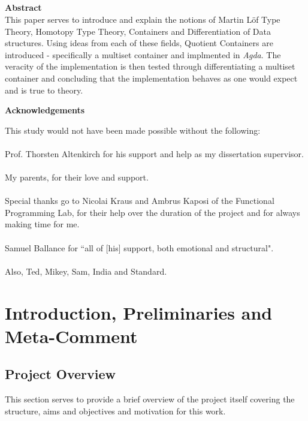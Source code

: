 \documentclass[12pt]{report}
\begin{document}
\setcounter{chapter}{-1}
\chapter{}
\Huge
\noindent \textbf{Abstract}\\

\normalsize
This paper serves to introduce and explain the notions of Martin L\"of Type Theory, Homotopy Type Theory, Containers and Differentiation of Data structures. Using ideas from each of these fields, Quotient Containers are introduced - specifically a multiset container and implmented in \textit{Agda}. The veracity of the implementation is then tested through differentiating a multiset container and concluding that the implementation behaves as one would expect and is true to theory.

\Huge

\noindent \textbf{Acknowledgements}

\normalsize

This study would not have been made possible without the following:\\
\\
Prof. Thorsten Altenkirch for his support and help as my dissertation supervisor.\\
\\
My parents, for their love and support.\\
\\
Special thanks go to Nicolai Kraus and Ambrus Kaposi of the Functional Programming Lab, for their help over the duration of the project and for always making time for me.\\
\\
Samuel Ballance for ``all of [his] support, both emotional and structural".
\\
\\
Also, Ted, Mikey, Sam, India and Standard.

\part{Introduction, Preliminaries and Meta-Comment}
\chapter{Project Overview}
This section serves to provide a brief overview of the project itself covering the structure, aims and objectives and motivation for this work. 
\end{document}

